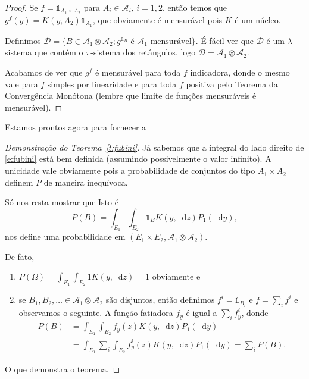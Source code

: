 \documentclass[reqno, draft]{book}
\newcommand*\1{\mathds{1}}
\renewcommand*\d{\mathop{}\!\mathrm{d}}
\begin{document}
\begin{proof}
  Se $f = \1_{A_1 \times A_2}$ para $A_i \in \mathcal{A}_i$, $i = 1,2$, então temos que $g^f(y) = K(y, A_2) \1_{A_1}$, que obviamente é mensurável pois $K$ é um núcleo.

  Definimos $\mathcal{D} = \{B \in \mathcal{A}_1 \otimes \mathcal{A}_2; g^{\1_B} \text{ é $\mathcal{A}_1$-mensurável}\}$.
  É fácil ver que $\mathcal{D}$ é um $\lambda$-sistema que contém o $\pi$-sistema dos retângulos, logo $\mathcal{D} = \mathcal{A}_1 \otimes \mathcal{A}_2$.

  Acabamos de ver que $g^f$ é mensurável para toda $f$ indicadora, donde o mesmo vale para $f$ simples por linearidade e para toda $f$ positiva pelo Teorema da Convergência Monótona (lembre que limite de funções mensuráveis é mensurável).
\end{proof}

Estamos prontos agora para fornecer a
\begin{proof}[Demonstração do Teorema~\ref{t:fubini}]
  Já sabemos que a integral do lado direito de \eqref{e:fubini} está bem definida (assumindo possivelmente o valor infinito).
  A unicidade vale obviamente pois a probabilidade de conjuntos do tipo $A_1 \times A_2$ definem $P$ de maneira inequívoca.


  Só nos resta mostrar que
  Isto é
  \begin{equation}
    P(B) = \int_{E_1} \int_{E_2} \1_{B} K(y, \d z) P_1 (\d y),
  \end{equation}
  nos define uma probabilidade em $(E_1 \times E_2, \mathcal{A}_1 \otimes \mathcal{A}_2)$.

  De fato,
  \begin{enumerate}[\quad a)]
  \item $P(\Omega) = \int_{E_1} \int_{E_2} 1 K(y, \d z) = 1$ obviamente e
  \item se $B_1, B_2, \dots \in \mathcal{A}_1 \otimes \mathcal{A}_2$ são disjuntos, então definimos $f^i = \1_{B_i}$ e $f = \sum_i f^i$ e observamos o seguinte.
    A função fatiadora $f_y$ é igual a $\sum_i f^i_y$, donde
    \begin{equation}
      \begin{split}
        P(B) & = \int_{E_1} \int_{E_2} f_y(z) K(y, \d z) P_1(\d y)\\
        & = \int_{E_1} \sum_i \int_{E_2} f^i_y(z) K(y, \d z) P_1(\d y) = \sum_i P(B).
      \end{split}
    \end{equation}
  \end{enumerate}
  O que demonstra o teorema.
\end{proof}
\end{document}
